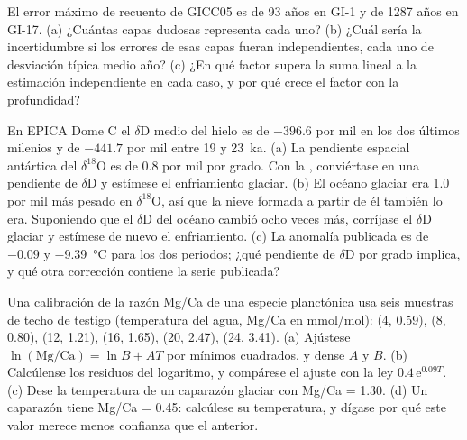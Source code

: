 \begin{exercise}[$\star\star$]\label{exo:b2:climate-proxies:9}
El error máximo de recuento de GICC05 es de 93 años en GI-1 y de \num{1287} años en GI-17. (a) ¿Cuántas
capas dudosas representa cada uno? (b) ¿Cuál sería la incertidumbre si los errores de esas
capas fueran independientes, cada uno de desviación típica medio año? (c) ¿En qué factor supera la
suma lineal a la estimación independiente en cada caso, y por qué crece el factor con la profundidad?
\end{exercise}

\begin{exercise}[$\star\star\star$]\label{exo:b2:climate-proxies:10}
En EPICA Dome C el $\delta$D medio del hielo es de $-396.6$ por mil en los dos últimos milenios
y de $-441.7$ por mil entre 19 y \qty{23}{ka}. (a) La pendiente espacial antártica del $\delta^{18}$O es de
\num{0.8} por mil por grado. Con la , conviértase en una pendiente de $\delta$D y
estímese el enfriamiento glaciar. (b) El océano glaciar era \num{1.0} por mil más pesado en
$\delta^{18}$O, así que la nieve formada a partir de él también lo era. Suponiendo que el $\delta$D del océano
cambió ocho veces más, corríjase el $\delta$D glaciar y estímese de nuevo el enfriamiento.
(c) La anomalía publicada es de $-0.09$ y \qty{-9.39}{\celsius} para los dos periodos; ¿qué pendiente de
$\delta$D por grado implica, y qué otra corrección contiene la serie publicada?
\end{exercise}

\begin{exercise}[$\star\star\star$]\label{exo:b2:climate-proxies:11}
Una calibración de la razón Mg/Ca de una especie planctónica usa seis muestras de techo de testigo (temperatura del agua,
Mg/Ca en \unit{mmol/mol}): (4, 0.59), (8, 0.80), (12, 1.21), (16, 1.65), (20, 2.47), (24, 3.41).
(a) Ajústese $\ln(\text{Mg/Ca}) = \ln B + AT$ por mínimos cuadrados, y dense $A$ y $B$. (b) Calcúlense los
residuos del logaritmo, y compárese el ajuste con la ley $0.4\,\mathrm{e}^{0.09T}$. (c) Dese la
temperatura de un caparazón glaciar con Mg/Ca = 1.30. (d) Un caparazón tiene Mg/Ca = 0.45: calcúlese su
temperatura, y dígase por qué este valor merece menos confianza que el anterior.
\end{exercise}

